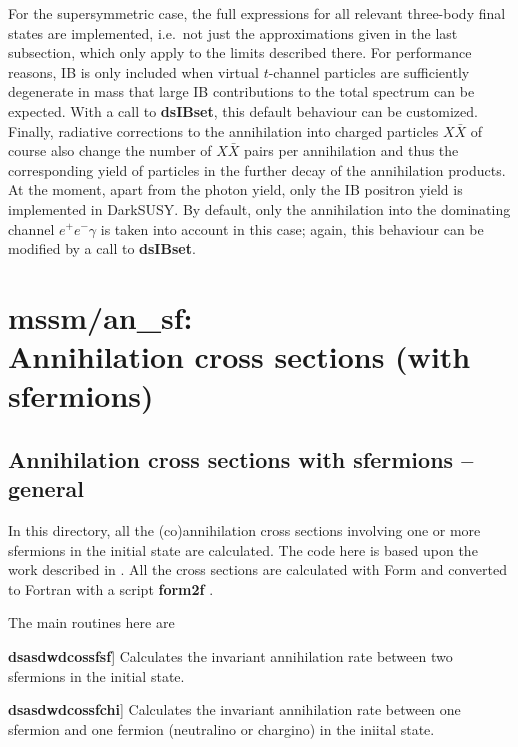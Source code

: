 \documentclass[a4paper,10pt,oneside]{book}
\newcommand{\code}[1]{\ft{#1}}
\newcommand{\codeb}[1]{\ftb{#1}}
\newcommand{\ds}{{\sffamily DarkSUSY}}
\newenvironment{brief-subs}{\begin{list}{}{\setlength{\labelwidth}{2.5 cm}
\setlength{\labelsep}{0.5 cm} \setlength{\leftmargin}{3.0 cm}
\setlength{\itemsep}{0.5 ex} \setlength{\parsep}{0.0 cm}
\setlength{\topsep}{0.0 cm} \setlength{\parskip}{0.0 cm}}
\bsub{\rmfamily Routine} {\bfseries Purpose}
\raisebox{-0.5ex}{}\hrule
}{\end{list}
\hrule
\smallskip
}
\newcommand{\bitem}[1]{\makebox[2.5 cm][l]{\ftb{#1}}}
\newcommand{\bsub}[1]{\item[\bitem{#1}]}
\newcommand{\ft}[1]{\textsf{#1}}
\newcommand{\ftb}[1]{{\bfseries \sffamily #1}}
\begin{document}
For the supersymmetric case, the 
full expressions for all relevant three-body final states are implemented, i.e.~not 
just the 
approximations given in the last subsection, which only apply to the limits 
described there.
For performance reasons, IB is only included when virtual $t$-channel particles 
are sufficiently degenerate in mass that large IB contributions to the total 
spectrum can be expected. With a call to  \ftb{dsIBset}, this 
default
behaviour can be 
customized.
Finally, radiative corrections to the annihilation into charged particles $X\bar X$ 
of course also change the number of $X\bar X$ pairs per annihilation and thus the 
corresponding yield of particles in the further decay of the annihilation products. 
At the moment, apart from the photon yield, only the IB positron yield is 
implemented in \ds. By default, only the annihilation into the dominating channel $e^+e^-\gamma$ is taken into account in this case; again, this behaviour can be modified by a call to \ftb{dsIBset}.



\section[mssm/an\_sf: Annihilation cross sections (with sfermions)]{\codeb{mssm/an\_sf}:\\ Annihilation cross sections (with sfermions)}
\label{sec:src_models/mssm/an_sf}


\subsection{Annihilation cross sections with sfermions -- general }

In this directory, all the (co)annihilation cross sections involving
one or more sfermions in the initial state are calculated. The code
here is based upon the work described in \cite{Edsjo:2003us}. All the cross
sections are calculated with \code{Form} and converted to Fortran with
a script \codeb{form2f} \cite{form2f}. 

The main routines here are

\begin{brief-subs}
\bsub{dsasdwdcossfsf}
  Calculates the invariant annihilation rate between two sfermions in
  the initial state.
\bsub{dsasdwdcossfchi}
  Calculates the invariant annihilation rate between one sfermion and
  one fermion (neutralino or chargino) in the iniital state.
\end{brief-subs}
\end{document}
